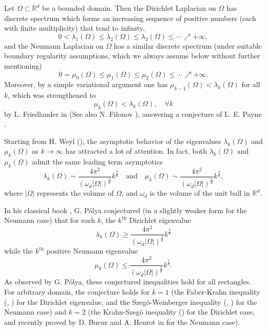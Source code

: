 \documentclass[11pt,letterpaper]{amsart}
\numberwithin{equation}{section}
\theoremstyle{plain}
\theoremstyle{plain}
\numberwithin{equation}{section}
\theoremstyle{remark}
\begin{document}
	Let $\Omega \subset \mathbb{R}^d$ be a bounded domain.   
	Then the Dirichlet Laplacian on $\Omega$ has discrete spectrum  which forms an increasing sequence of positive numbers (each with finite multiplicity) that tend to infinity, 
	\[
	0< \lambda_1(\Omega)\le \lambda_2(\Omega)\leq \lambda_3(\Omega) \leq \cdots \nearrow +\infty,
	\]
	and the Neumann Laplacian on $\Omega$ has a similar discrete spectrum (under suitable boundary regularity assumptions, which we always assume below without further mentioning)
	\[
	0= \mu_0(\Omega)\le \mu_1(\Omega)\leq \mu_2(\Omega) \leq \cdots \nearrow +\infty. 
	\]	
	Moreover, by a simple variational argument one has $\mu_{k-1}(\Omega)<\lambda_k(\Omega)$ for all $k$, which was strengthened to 
	\begin{equation}\label{Friedl}
		\mu_{k}(\Omega)<\lambda_k(\Omega),\quad \forall k 
	\end{equation}
	by L. Friedlander in \cite{Fri91} (See also N. Filonov \cite{Fil2004}), answering a conjecture of L. E. Payne \cite{PP55}.
	
	Starting from H. Weyl (\cite{W}), the asymptotic behavior of the  eigenvalues $\lambda_k(\Omega)$ and $\mu_k(\Omega)$ as $k \to \infty$ has attracted a lot of attention. In fact, both $\lambda_k(\Omega)$ and $\mu_k(\Omega)$ admit the same leading term asymptotics 
	\[ 
	\lambda_k(\Omega) \sim  \frac{4\pi^2}{(\omega_d |\Omega|)^{\frac 2d}} k^{\frac 2d}
	\quad \text{and} \quad 
	\mu_k(\Omega) \sim  \frac{4\pi^2}{(\omega_d |\Omega|)^{\frac 2d}} k^{\frac 2d},
	\]  
	where $|\Omega|$ represents the volume of $\Omega$, and $\omega_d$ is the volume of the unit ball in $\mathbb R^d$. 
	
	In his classical book \cite{P54},  G. P\'olya conjectured  (in a slightly weaker form for the Neumann case)  %
	that for each $k$, the $k^{\mathrm{th}}$ Dirichlet eigenvalue 
	\begin{equation}\label{PCDir}
		\lambda_k(\Omega) \ge   \frac{4\pi^2}{(\omega_d |\Omega|)^{\frac 2d}} k^{\frac 2d}
	\end{equation}
	while the $k^{\mathrm{th}}$ positive Neumann eigenvalue    
	\begin{equation}\label{PCNeu}
		\mu_k(\Omega) \le   \frac{4\pi^2}{(\omega_d |\Omega|)^{\frac 2d}} k^{\frac 2d}.
	\end{equation}
	As observed by G. P\'olya, these conjectured inequalities hold for all rectangles. For arbitrary domain, the conjecture holds for $k=1$ (the Faber-Krahn inequality (\cite{F23}, \cite{K25}) for the Dirichlet eigenvalue, and the Szeg\"o-Weinberger inequality (\cite{S54}, \cite{We}) for the Neumann case) and $k=2$ (the Krahn-Szeg\"o inequality (\cite{K26}) for the Dirichlet case, and recently proved by D. Bucur and A. Henrot in \cite{BH19} for the Neumann case). 
	
\end{document}
